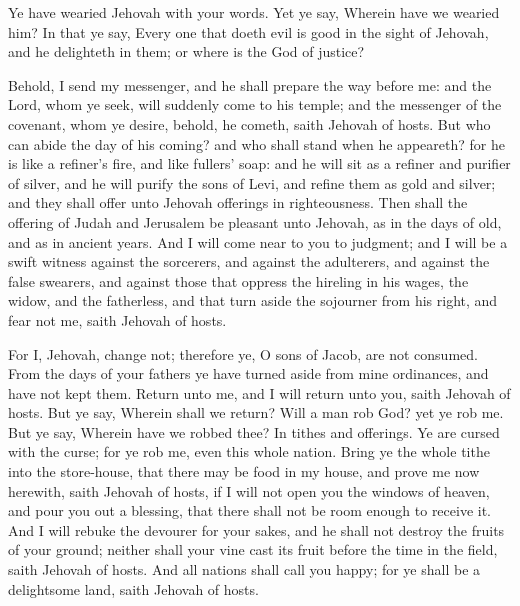 Ye have wearied Jehovah with your words. Yet ye say, Wherein have we wearied him? In that ye say, Every one that doeth evil is good in the sight of Jehovah, and he delighteth in them; or where is the God of justice? 

Behold, I send my messenger, and he shall prepare the way before me: and the Lord, whom ye seek, will suddenly come to his temple; and the messenger of the covenant, whom ye desire, behold, he cometh, saith Jehovah of hosts. But who can abide the day of his coming? and who shall stand when he appeareth? for he is like a refiner’s fire, and like fullers’ soap: and he will sit as a refiner and purifier of silver, and he will purify the sons of Levi, and refine them as gold and silver; and they shall offer unto Jehovah offerings in righteousness. Then shall the offering of Judah and Jerusalem be pleasant unto Jehovah, as in the days of old, and as in ancient years. And I will come near to you to judgment; and I will be a swift witness against the sorcerers, and against the adulterers, and against the false swearers, and against those that oppress the hireling in his wages, the widow, and the fatherless, and that turn aside the sojourner from his right, and fear not me, saith Jehovah of hosts. 

For I, Jehovah, change not; therefore ye, O sons of Jacob, are not consumed.  From the days of your fathers ye have turned aside from mine ordinances, and have not kept them. Return unto me, and I will return unto you, saith Jehovah of hosts. But ye say, Wherein shall we return? Will a man rob God? yet ye rob me. But ye say, Wherein have we robbed thee? In tithes and offerings. Ye are cursed with the curse; for ye rob me, even this whole nation. Bring ye the whole tithe into the store-house, that there may be food in my house, and prove me now herewith, saith Jehovah of hosts, if I will not open you the windows of heaven, and pour you out a blessing, that there shall not be room enough to receive it. And I will rebuke the devourer for your sakes, and he shall not destroy the fruits of your ground; neither shall your vine cast its fruit before the time in the field, saith Jehovah of hosts. And all nations shall call you happy; for ye shall be a delightsome land, saith Jehovah of hosts.  

